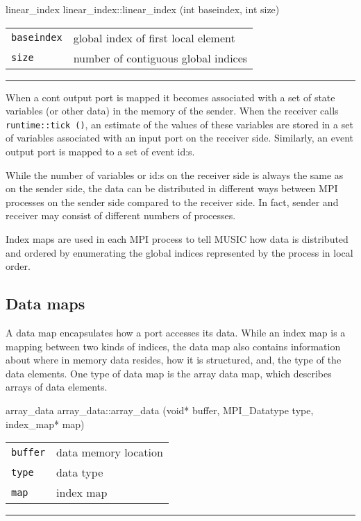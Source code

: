\documentclass[a4paper]{report}
\makeatletter
\newenvironment{parameters}%
{\begin{tabular}{@{\hspace{2em}}lp{0.6\textwidth}}}%
{\end{tabular}\par\vspace{1mm}\par\hrule\par\vspace{5mm}}
\makeatother
\begin{document}
\begin{head}{linear_index}
  linear_index::linear_index (int baseindex, int size)
\end{head}
\begin{parameters}
  \lstinline|baseindex| & global index of first local element \\
  \lstinline|size| & number of contiguous global indices \\
\end{parameters}

When a cont output port is mapped it becomes associated with a set of
state variables (or other data) in the memory of the sender.  When the
receiver calls \lstinline|runtime::tick ()|, an estimate of the values
of these variables are stored in a set of variables associated with an
input port on the receiver side.  Similarly, an event output port is
mapped to a set of event id:s.

While the number of variables or id:s on the receiver side is always
the same as on the sender side, the data can be distributed in
different ways between MPI processes on the sender side compared to
the receiver side.  In fact, sender and receiver may consist of
different numbers of processes.

Index maps are used in each MPI process to tell MUSIC how data is
distributed and ordered by enumerating the global indices represented
by the process in local order.

\subsection{Data maps}
\label{sec:datamap}

A data map encapsulates how a port accesses its data.  While an index
map is a mapping between two kinds of indices, the data map also
contains information about where in memory data resides, how it is
structured, and, the type of the data elements.  One type of data map
is the array data map, which describes arrays of data elements.

\begin{head}{array_data}
  array_data::array_data (void* buffer, MPI_Datatype type,
                          index_map* map)
\end{head}
\begin{parameters}
  \lstinline|buffer| & data memory location \\
  \lstinline|type|   & data type \\
  \lstinline|map|    & index map \\
\end{parameters}
\end{document}
